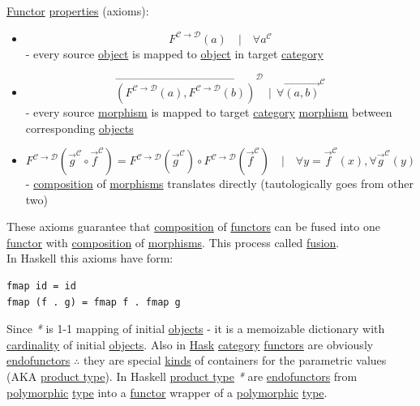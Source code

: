 \documentclass[11pt]{article}
\begin{document}
\hyperref[orgf2f6841]{Functor} \hyperref[org85fb3a1]{properties} (axioms):\\
\begin{itemize}
\item $$ F^{\mathcal{C \to D}}(a) \quad | \quad \forall a^{\mathcal{C}} $$ - every source \hyperref[org4be0e9d]{object} is mapped to \hyperref[org4be0e9d]{object} in target \hyperref[org0450535]{category}\\
\item $$ \overrightarrow{(F^{\mathcal{C \to D}}(a),F^{\mathcal{C \to D}}(b))}^{\mathcal{D}} \ \ | \ \ \forall \overrightarrow{(a, b)}^{\mathcal{C}} $$ - every source \hyperref[org5de09d4]{morphism} is mapped to target \hyperref[org0450535]{category} \hyperref[org5de09d4]{morphism} between corresponding \hyperref[org363acc2]{objects}\\
\item $$ F^{\mathcal{C \to D}}(\overrightarrow{g}^{\mathcal{C}} \circ \overrightarrow{f}^{\mathcal{C}}) = F^{\mathcal{C \to D}}(\overrightarrow{g}^{\mathcal{C}}) \circ F^{\mathcal{C \to D}}(\overrightarrow{f}^{\mathcal{C}}) \quad | \quad \forall y=\overrightarrow{f}^{\mathcal{C}}(x), \forall \overrightarrow{g}^{\mathcal{C}}(y) $$ - \hyperref[orga128e7f]{composition} of \hyperref[org6c2fa5c]{morphisms} translates directly (tautologically goes from other two)\\
\end{itemize}

These axioms guarantee that \hyperref[orga128e7f]{composition} of \hyperref[orgdd21ed6]{functors} can be fused into one \hyperref[orgf2f6841]{functor} with \hyperref[orga128e7f]{composition} of \hyperref[org6c2fa5c]{morphisms}. This process called \hyperref[org738c534]{fusion}.\\

In Haskell this axioms have form:\\
\begin{verbatim}
fmap id = id
fmap (f . g) = fmap f . fmap g
\end{verbatim}

Since \emph{*} is 1-1 mapping of initial \hyperref[org363acc2]{objects} - it is a memoizable dictionary with \hyperref[org2c20526]{cardinality} of initial \hyperref[org363acc2]{objects}. Also in \hyperref[org02813f7]{Hask} \hyperref[org0450535]{category} \hyperref[orgdd21ed6]{functors} are obviously \hyperref[orgfcca64a]{endofunctors} \(\therefore\) they are special \hyperref[org6ff3066]{kinds} of containers for the parametric values (AKA \hyperref[org04c05d6]{product type}). In Haskell \hyperref[org04c05d6]{product type} \emph{*} are \hyperref[orgfcca64a]{endofunctors} from \hyperref[orgac4d581]{polymorphic} \hyperref[orgc4aea2f]{type} into a \hyperref[orgf2f6841]{functor} wrapper of a \hyperref[orgac4d581]{polymorphic} \hyperref[orgc4aea2f]{type}.\\
\end{document}
